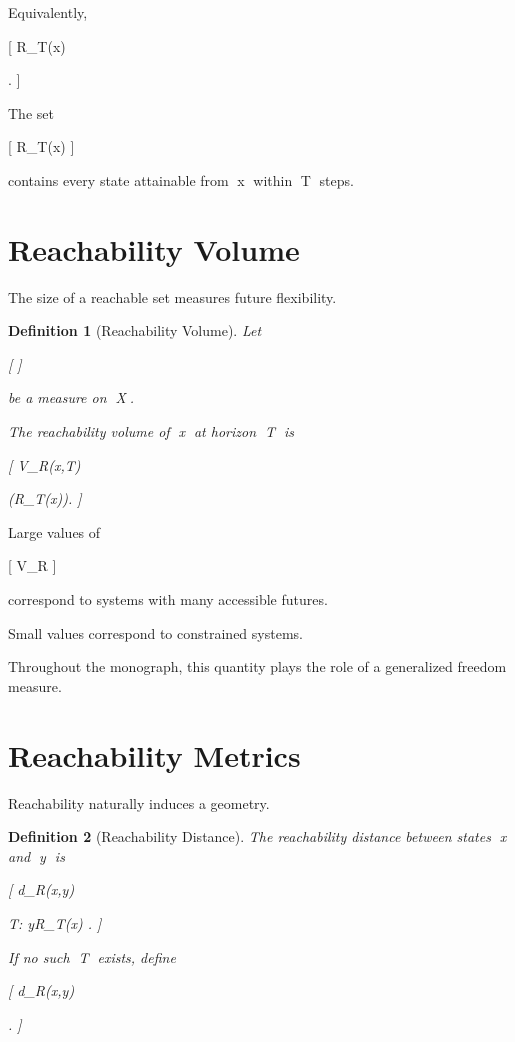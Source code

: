 \documentclass[11pt,oneside,openany]{book}
\newtheorem{definition}{Definition}[chapter] \newtheorem{theorem}{Theorem}[chapter] \newtheorem{proposition}{Proposition}[chapter] \newtheorem{lemma}{Lemma}[chapter] \newtheorem{corollary}{Corollary}[chapter] \newtheorem{remark}{Remark}[chapter]
\begin{document}
Equivalently,

[
R_T(x)

.
]

The set

[
R_T(x)
]

contains every state attainable from x within T steps.

\section{Reachability Volume}

The size of a reachable set measures future flexibility.

\begin{definition}[Reachability Volume]

Let

[
\mu
]

be a measure on X.

The reachability volume of x at horizon T is

[
V_R(x,T)

\mu(R_T(x)).
]

\end{definition}

Large values of

[
V_R
]

correspond to systems with many accessible futures.

Small values correspond to constrained systems.

Throughout the monograph, this quantity plays the role of a generalized freedom measure.

\section{Reachability Metrics}

Reachability naturally induces a geometry.

\begin{definition}[Reachability Distance]

The reachability distance between states x and y is

[
d_R(x,y)

\inf
{
T:
y\in R_T(x)
}.
]

If no such T exists, define

[
d_R(x,y)

\infty.
]

\end{definition}
\end{document}
